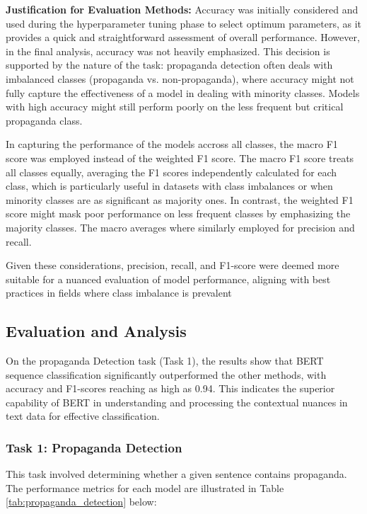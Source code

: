 \documentclass[twocolumn]{article}
\begin{document}
\textbf{Justification for Evaluation Methods:}
Accuracy was initially considered and used during the hyperparameter tuning phase to select optimum parameters, as it provides a quick and straightforward assessment of overall performance. However, in the final analysis, accuracy was not heavily emphasized. This decision is supported by the nature of the task: propaganda detection often deals with imbalanced classes (propaganda vs. non-propaganda), where accuracy might not fully capture the effectiveness of a model in dealing with minority classes. Models with high accuracy might still perform poorly on the less frequent but critical propaganda class.

In capturing the performance of the models accross all classes, the macro F1 score was employed instead of the weighted F1 score. The macro F1 score treats all classes equally, averaging the F1 scores independently calculated for each class, which is particularly useful in datasets with class imbalances or when minority classes are as significant as majority ones. In contrast, the weighted F1 score might mask poor performance on less frequent classes by emphasizing the majority classes. The macro averages where similarly employed for precision and recall.

Given these considerations, precision, recall, and F1-score were deemed more suitable for a nuanced evaluation of model performance, aligning with best practices in fields where class imbalance is prevalent \citep{chawlaSMOTESyntheticMinority2002, sokolovaSystematicAnalysisPerformance2009}

\subsection*{Evaluation and Analysis}
On the propaganda Detection task (Task 1), the results show that BERT sequence classification significantly outperformed the other methods, with accuracy and F1-scores reaching as high as 0.94. This indicates the superior capability of BERT in understanding and processing the contextual nuances in text data for effective classification.

\subsubsection*{Task 1: Propaganda Detection}
This task involved determining whether a given sentence contains propaganda. The performance metrics for each model are illustrated in Table \ref{tab:propaganda_detection} below:
\end{document}
